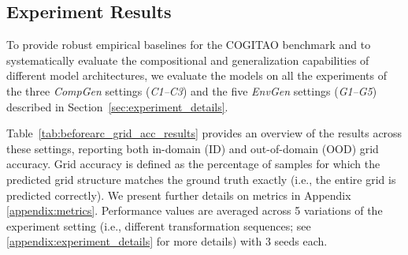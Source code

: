 \subsection{Experiment Results}


To provide robust empirical baselines for the COGITAO benchmark and to systematically evaluate the compositional and generalization capabilities of different model architectures, we evaluate the models on all the experiments of the three \textit{CompGen} settings (\emph{C1–C3}) and the five \textit{EnvGen} settings (\emph{G1–G5}) described in Section~\ref{sec:experiment_details}.

%

Table~\ref{tab:beforearc_grid_acc_results} provides an overview of the results across these settings, reporting both in-domain (ID) and out-of-domain (OOD) grid accuracy. Grid accuracy is defined as the percentage of samples for which the predicted grid structure matches the ground truth exactly (i.e., the entire grid is predicted correctly). We present further details on metrics in Appendix \ref{appendix:metrics}.  Performance values are averaged across 5 variations of the experiment setting (i.e., different transformation sequences; see \ref{appendix:experiment_details} for more details) with 3 seeds each. 



